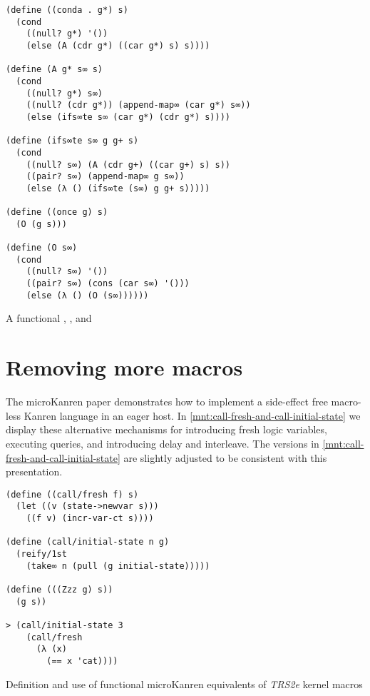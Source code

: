 \documentclass[sigplan,balance=true,pbalance=true,natbib=false]{acmart}
\begin{document}
\begin{listing}[h]
  \begin{verbatim}
(define ((conda . g*) s)
  (cond
    ((null? g*) '())
    (else (A (cdr g*) ((car g*) s) s))))

(define (A g* s∞ s)
  (cond
    ((null? g*) s∞)
    ((null? (cdr g*)) (append-map∞ (car g*) s∞))
    (else (ifs∞te s∞ (car g*) (cdr g*) s))))

(define (ifs∞te s∞ g g+ s)
  (cond
    ((null? s∞) (A (cdr g+) ((car g+) s) s))
    ((pair? s∞) (append-map∞ g s∞))
    (else (λ () (ifs∞te (s∞) g g+ s)))))

(define ((once g) s)
  (O (g s)))

(define (O s∞)
  (cond
    ((null? s∞) '())
    ((pair? s∞) (cons (car s∞) '()))
    (else (λ () (O (s∞))))))
  \end{verbatim}
  \caption{A functional , , and }\label{mnt:conda-implementation}
\end{listing}

\section{Removing more macros}\label{sec:functional}

The \citeyear{hemann2013muKanren} microKanren paper demonstrates how
to implement a side-effect free macro-less Kanren language in an eager
host. In \cref{mnt:call-fresh-and-call-initial-state} we display these
alternative mechanisms for introducing fresh logic variables,
executing queries, and introducing delay and interleave. The versions
in \cref{mnt:call-fresh-and-call-initial-state} are slightly adjusted
to be consistent with this presentation.

\begin{listing}
  \begin{verbatim}
(define ((call/fresh f) s)
  (let ((v (state->newvar s)))
    ((f v) (incr-var-ct s))))

(define (call/initial-state n g)
  (reify/1st
    (take∞ n (pull (g initial-state)))))

(define (((Zzz g) s))
  (g s))

> (call/initial-state 3
    (call/fresh
      (λ (x)
        (== x 'cat))))
  \end{verbatim}
  \caption{Definition and use of functional microKanren equivalents of \emph{TRS2e} kernel macros}\label{mnt:call-fresh-and-call-initial-state}
\end{listing}
\end{document}
